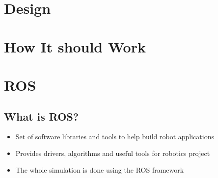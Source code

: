 \documentclass[a0,portrait]{a0poster}
\begin{document}
\begin{multicols}{2}
  \section*{Design}
  \begin{center}\vspace{1cm}
  \end{center}%


  \color{Black} %

  \section*{How It should Work}

  \begin{center}\vspace{1cm}
  \end{center}
  \vspace{1cm}

  \section*{ROS}
  \subsection*{What is ROS?}
  \begin{itemize}
  \item Set of software libraries and tools to help build robot applications
  \item Provides drivers, algorithms and useful tools for robotics project
  \item The whole simulation is done using the ROS framework
  \end{itemize}

\end{multicols}
\end{document}
